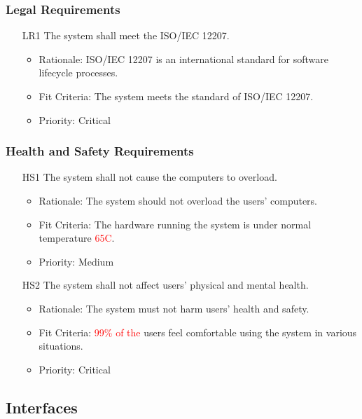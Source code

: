 \documentclass[12pt]{article}
\begin{document}
\subsubsection{Legal Requirements}
\begin{itemize}
    \item[LR1] The system shall meet the ISO/IEC 12207. \label{LR1}
    \begin{itemize}
        \item Rationale: ISO/IEC 12207 is an international standard for software lifecycle processes.
        \item Fit Criteria: The system meets the standard of ISO/IEC 12207.
        \item Priority: Critical
    \end{itemize}
\end{itemize}
\subsubsection{Health and Safety Requirements}
\begin{itemize}
    \item[HS1] The system shall not cause the computers to overload. \label{HS1}
    \begin{itemize}
        \item Rationale: The system should not overload the users’ computers.
        \item Fit Criteria: The hardware running the system is under normal temperature \textcolor{red}{65\degree C}.
        \item Priority: Medium
    \end{itemize}
\end{itemize}
\begin{itemize}
    \item[HS2] The system shall not affect users’ physical and mental health. \label{HS2}
    \begin{itemize}
        \item Rationale: The system must not harm users’ health and safety.
        \item Fit Criteria: \textcolor{red}{99\% of the} users feel comfortable using the system in various situations.
        \item Priority: Critical
    \end{itemize}
\end{itemize}

\subsection{Interfaces}
\end{document}
